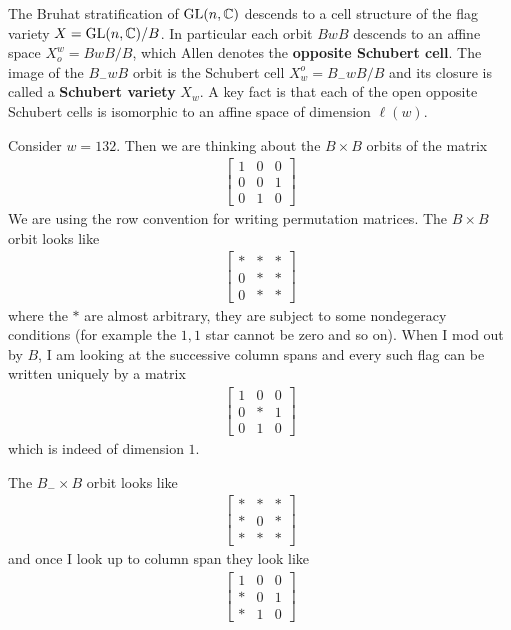 \documentclass[12pt]{article}
\begin{document}
The Bruhat stratification of $\operatorname{GL}(n,\mathbb{C})$ descends to a cell structure of the flag variety $X = \operatorname{GL}(n,\mathbb{C})/B$.
In particular each orbit $BwB$ descends to an affine space $X^w_o = BwB/B$, which Allen denotes the \textbf{opposite Schubert cell}.
The image of the $B_{-}wB$ orbit is the Schubert cell $X_w^o = B_-wB/B$ and its closure is called a \textbf{Schubert variety} $X_w$.
A key fact is that each of the open opposite Schubert cells is isomorphic to an affine space of dimension $\ell(w)$.

\begin{example}
    Consider $w = 132$. Then we are thinking about the $B\times B$ orbits of the matrix \begin{align*}
        \begin{bmatrix}
            1 & 0 & 0 \\
            0 & 0 & 1 \\
            0 & 1 & 0
        \end{bmatrix} 
    \end{align*} We are using the row convention for writing permutation matrices.
    The $B\times B$ orbit looks like \begin{align*}
        \begin{bmatrix}
            * & * & * \\
            0 & * & * \\
            0 & * & *
        \end{bmatrix}
    \end{align*} where the $*$ are almost arbitrary, they are subject to some nondegeracy conditions (for example the 
    $1,1$ star cannot be zero and so on). When I mod out by $B$, I am looking at the successive column spans and every such
    flag can be written uniquely by a matrix \begin{align*}
        \begin{bmatrix}
            1 & 0 & 0 \\
            0 & * & 1 \\
            0 & 1 & 0
        \end{bmatrix} 
    \end{align*} which is indeed of dimension $1$.
    
    The $B_-\times B$ orbit looks like \begin{align*}
        \begin{bmatrix}
            * & * & * \\
            * & 0 & * \\
            * & * & *
        \end{bmatrix} 
    \end{align*} and once I look up to column span they look like  \begin{align*}
        \begin{bmatrix}
            1 & 0 & 0 \\
            * & 0 & 1 \\
            * & 1 & 0
        \end{bmatrix}
    \end{align*}

\end{example}
\hfill
\end{document}
